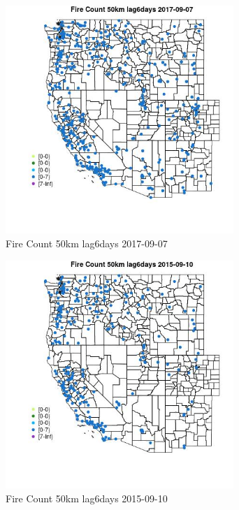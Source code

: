\begin{figure} 
\centering  
\includegraphics[width=0.77\textwidth]{Code_Outputs/Report_ML_input_PM25_Step4_part_e_de_duplicated_aves_compiled_2019-05-21wNAs_MapObsFire_Count_50km_lag6days2017-09-07.jpg} 
\caption{\label{fig:Report_ML_input_PM25_Step4_part_e_de_duplicated_aves_compiled_2019-05-21wNAsMapObsFire_Count_50km_lag6days2017-09-07}Fire Count 50km lag6days 2017-09-07} 
\end{figure} 
 

\begin{figure} 
\centering  
\includegraphics[width=0.77\textwidth]{Code_Outputs/Report_ML_input_PM25_Step4_part_e_de_duplicated_aves_compiled_2019-05-21wNAs_MapObsFire_Count_50km_lag6days2015-09-10.jpg} 
\caption{\label{fig:Report_ML_input_PM25_Step4_part_e_de_duplicated_aves_compiled_2019-05-21wNAsMapObsFire_Count_50km_lag6days2015-09-10}Fire Count 50km lag6days 2015-09-10} 
\end{figure} 
 

